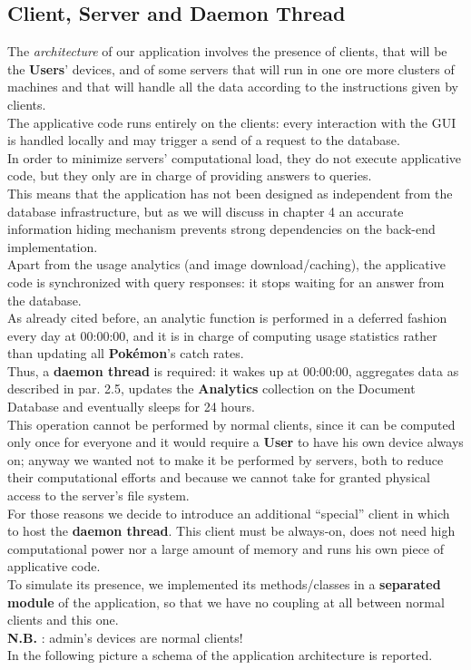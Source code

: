 \subsection{Client, Server and Daemon Thread}
The \textit{architecture} of our application involves the presence of clients, that will be the \textbf{Users}’ devices, and of some servers that will run in one ore more clusters of machines and that will handle all the data according to the instructions given by clients.\\
The applicative code runs entirely on the clients: every interaction with the GUI is handled locally and may trigger a send of a request to the database.\\
In order to minimize servers’ computational load, they do not execute applicative code, but they only are in charge of providing answers to queries.\\
This means that the application has not been designed as independent from the database infrastructure, but as we will discuss in chapter 4 an accurate information hiding mechanism prevents strong dependencies on the back-end implementation.\\
Apart from the usage analytics (and image download/caching), the applicative code is synchronized with query responses: it stops waiting for an answer from the database. \medskip \\
As already cited before, an analytic function is performed in a deferred fashion every day at 00:00:00, and it is in charge of computing usage statistics rather than updating all \textbf{Pokémon}’s catch rates. \\
Thus, a \textbf{daemon thread} is required: it wakes up at 00:00:00, aggregates data as described in par. 2.5, updates the \textbf{Analytics} collection on the Document Database and eventually sleeps for 24 hours.\\
This operation cannot be performed by normal clients, since it can be computed only once for everyone and it would require a \textbf{User} to have his own device always on; anyway we wanted not to make it be performed by servers, both to reduce their computational efforts and because we cannot take for granted physical access to the server’s file system. \medskip \\

For those reasons we decide to introduce an additional “special” client in which to host the \textbf{daemon thread}. This client must be always-on, does not need high computational power nor a large amount of memory and runs his own piece of applicative code.\\
To simulate its presence, we implemented its methods/classes in a \textbf{separated module} of the application, so that we have no coupling at all between normal clients and this one. \\
\textbf{N.B.} : admin’s devices are normal clients!\\
In the following picture a schema of the application architecture is reported.

